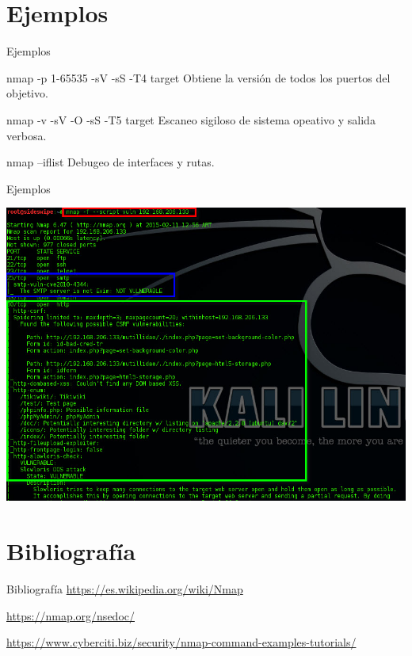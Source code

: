 \documentclass{beamer}
\begin{document}
\section{Ejemplos}
\begin{frame}{Ejemplos}
	\begin{block}{nmap -p 1-65535 -sV -sS -T4 target}
		Obtiene la versión de todos los puertos del objetivo.
	\end{block}
	\begin{block}{nmap -v -sV -O -sS -T5 target}
		Escaneo sigiloso de sistema opeativo y salida verbosa.
	\end{block}
	\begin{block}{nmap --iflist}
		Debugeo de interfaces y rutas.
	\end{block}
\end{frame}

\begin{frame}{Ejemplos}
	\begin{center}
			\includegraphics[scale=0.45]{Vuln.jpg}
	\end{center}

\end{frame}

\section{Bibliografía}
\begin{frame}{Bibliografía}
	\url{https://es.wikipedia.org/wiki/Nmap}
	
	\url{https://nmap.org/nsedoc/}
	
	\url{https://www.cyberciti.biz/security/nmap-command-examples-tutorials/}
\end{frame}
\end{document}
